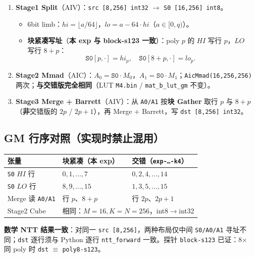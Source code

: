 \documentclass[UTF8,a4paper,11pt]{ctexart}
\begin{document}
\begin{enumerate}
  \item \textbf{Stage1 Split}（AIV）：\texttt{src [8,256] int32} $\rightarrow$ \texttt{S0 [16,256] int8}。
    \begin{itemize}
      \item 6bit limb：$hi=\lfloor a/64\rfloor$，$lo=a-64\cdot hi$（$a\in[0,q)$）。
      \item \textbf{块紧凑写址}（\textbf{本 exp 与 block-s123 一致}）：poly $p$ 的 $HI$ 写行 $p$，$LO$ 写行 $8{+}p$：
      \[
        \texttt{S0}[p,\cdot]=hi_p,\quad \texttt{S0}[8{+}p,\cdot]=lo_p.
      \]
    \end{itemize}
  \item \textbf{Stage2 Mmad}（AIC）：$A_0=\texttt{S0}\cdot M_0$，$A_1=\texttt{S0}\cdot M_1$；\texttt{AicMmad(16,256,256)} 两次；\textbf{与交错版完全相同}（LUT \texttt{M4.bin} / \texttt{mat\_b\_lut\_gm} 不变）。
  \item \textbf{Stage3 Merge + Barrett}（AIV）：从 \texttt{A0/A1} 按\textbf{块 Gather} 取行 $p$ 与 $8{+}p$（\textbf{非}交错版的 $2p$ / $2p{+}1$），再 Merge + Barrett，写 \texttt{dst [8,256] int32}。
\end{enumerate}

\subsection{GM 行序对照（实现时禁止混用）}
\label{sec:layout}
\begin{table}[h]
  \centering
  \begin{tabular}{@{}lll@{}}
    \toprule
    张量 & 块紧凑（\textbf{本 exp}） & 交错（\texttt{exp-…-k4}） \\
    \midrule
    \texttt{S0} $HI$ 行 & $0,1,\ldots,7$ & $0,2,4,\ldots,14$ \\
    \texttt{S0} $LO$ 行 & $8,9,\ldots,15$ & $1,3,5,\ldots,15$ \\
    Merge 读 \texttt{A0/A1} & 行 $p$、$8{+}p$ & 行 $2p$、$2p{+}1$ \\
    Stage2 Cube & \multicolumn{2}{c}{相同：$M{=}16,K{=}N{=}256$，int8$\rightarrow$int32} \\
    \bottomrule
  \end{tabular}
\end{table}

\textbf{数学 NTT 结果一致}：对同一 \texttt{src [8,256]}，两种布局仅中间 \texttt{S0/A0/A1} 寻址不同；\texttt{dst} 逐行须与 Python 逐行 \texttt{ntt\_forward} 一致。探针 \texttt{block-s123} 已证：8$\times$同 poly 时 \texttt{dst} $\equiv$ \texttt{poly8-s123}。
\end{document}
